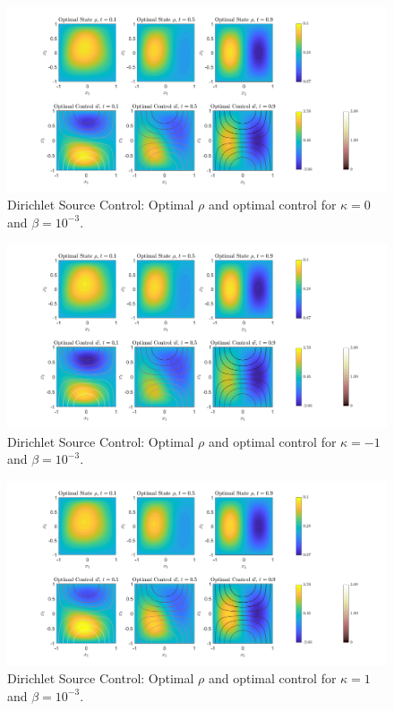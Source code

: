 \documentclass[11pt, a4paper]{article}
\theoremstyle{definition}
\begin{document}
	\begin{figure}[h]
		\centering
		\includegraphics[scale=0.35]{SCDk0.png}
		\caption{Dirichlet Source Control: Optimal $\rho$ and optimal control for $\kappa = 0$ and $\beta = 10^{-3}$.} 
		\label{F2a}
	\end{figure}
	\begin{figure}[h]
		\centering
		\includegraphics[scale=0.35]{SCDkn1.png}
		\caption{Dirichlet Source Control: Optimal $\rho$ and optimal control for $\kappa = -1$ and $\beta = 10^{-3}$.} 
		\label{F2b}
	\end{figure}
	\begin{figure}[h]
		\centering
		\includegraphics[scale=0.35]{SCDk1.png}
		\caption{Dirichlet Source Control: Optimal $\rho$ and optimal control for $\kappa = 1$ and $\beta = 10^{-3}$.} 
		\label{F2c}
	\end{figure}
	
\end{document}
